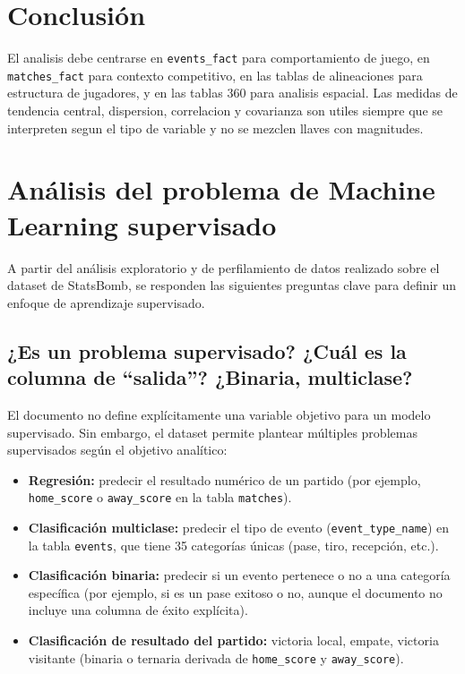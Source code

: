 \documentclass[12pt,a4paper]{article}
\begin{document}
\section{Conclusión}
El analisis debe centrarse en \texttt{events\_fact} para comportamiento de juego, en \texttt{matches\_fact} para contexto competitivo, en las tablas de alineaciones para estructura de jugadores, y en las tablas 360 para analisis espacial. Las medidas de tendencia central, dispersion, correlacion y covarianza son utiles siempre que se interpreten segun el tipo de variable y no se mezclen llaves con magnitudes.



\section{Análisis del problema de Machine Learning supervisado}

A partir del análisis exploratorio y de perfilamiento de datos realizado sobre el dataset de StatsBomb, se responden las siguientes preguntas clave para definir un enfoque de aprendizaje supervisado.

\subsection{¿Es un problema supervisado? ¿Cuál es la columna de “salida”? ¿Binaria, multiclase?}

El documento no define explícitamente una variable objetivo para un modelo supervisado. Sin embargo, el dataset permite plantear múltiples problemas supervisados según el objetivo analítico:

\begin{itemize}
    \item \textbf{Regresión:} predecir el resultado numérico de un partido (por ejemplo, \texttt{home\_score} o \texttt{away\_score} en la tabla \texttt{matches}).
    \item \textbf{Clasificación multiclase:} predecir el tipo de evento (\texttt{event\_type\_name}) en la tabla \texttt{events}, que tiene 35 categorías únicas (pase, tiro, recepción, etc.).
    \item \textbf{Clasificación binaria:} predecir si un evento pertenece o no a una categoría específica (por ejemplo, si es un pase exitoso o no, aunque el documento no incluye una columna de éxito explícita).
    \item \textbf{Clasificación de resultado del partido:} victoria local, empate, victoria visitante (binaria o ternaria derivada de \texttt{home\_score} y \texttt{away\_score}).
\end{itemize}
\end{document}
